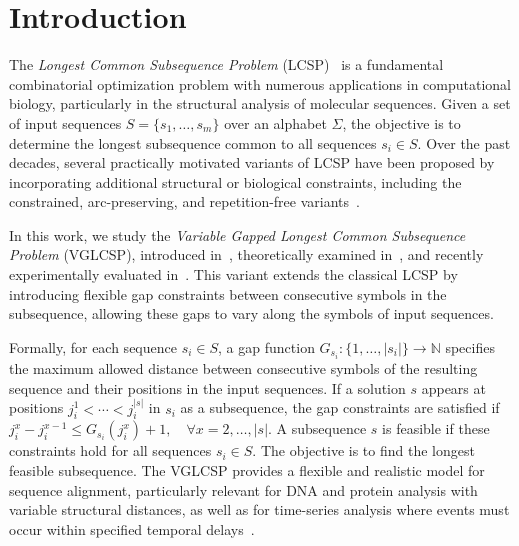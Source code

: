 \documentclass[runningheads]{llncs}
\begin{document}

\section{Introduction}

The \textit{Longest Common Subsequence Problem} (LCSP)~\cite{DJUKANOVIC2020106499} is a fundamental combinatorial optimization problem with numerous applications in computational biology, particularly in the structural analysis of molecular sequences. Given a set of input sequences $S=\{s_1,\ldots,s_m\}$ over an alphabet $\Sigma$, the objective is to determine the longest subsequence common to all sequences $s_i \in S$. Over the past decades, several practically motivated variants of LCSP have been proposed by incorporating additional structural or biological constraints, including the constrained, arc-preserving, and repetition-free variants~\cite{lafond2023longest,lin2002longest}.

In this work, we study the \textit{Variable Gapped Longest Common Subsequence Problem} (VGLCSP), introduced in~\cite{penga2011longest}, theoretically examined in~\cite{adamson2023longest}, and recently experimentally evaluated  in~\cite{djukanovic2026_eurocast}. This variant extends the classical LCSP by introducing flexible gap constraints between consecutive symbols in the subsequence, allowing these gaps to vary along the symbols of input sequences.

Formally, for each sequence $s_i \in S$, a gap function $G_{s_i} : \{1,\ldots,|s_i|\} \rightarrow \mathbb{N}$ specifies the maximum allowed distance between consecutive symbols of the resulting sequence and their positions in the input sequences. If a solution $s$ appears at positions $j_i^1 < \cdots < j_i^{|s|}$ in $s_i$ as a subsequence, the gap constraints are satisfied if $
j_i^x - j_i^{x-1} \leq G_{s_i}(j_i^x) + 1, \quad \forall x = 2,\ldots,|s|.$ 
A subsequence $s$ is feasible if these constraints hold for all sequences $s_i \in S$. The objective is to find the longest feasible subsequence. The VGLCSP provides a flexible and realistic model for sequence alignment, particularly relevant for DNA and protein analysis with variable structural distances, as well as for time-series analysis where events must occur within specified temporal delays~\cite{lainscsek2015delay}.
\end{document}

